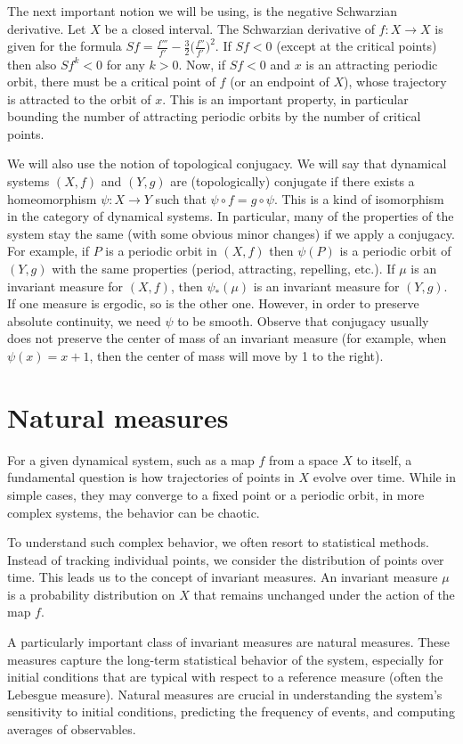 \documentclass[format=acmsmall, authorversion, screen=true]{acmart}
\begin{document}
The next important notion we will be using, is the negative Schwarzian derivative. Let $X$ be a closed interval. The Schwarzian derivative of $f\colon X\to X$ is given for the formula $Sf=\frac{f'''}{f'}-\frac32\big(\frac{f''}{f'}\big)^2$. If $Sf<0$ (except at the critical points) then also $Sf^k<0$ for any $k>0$. Now, if $Sf<0$ and $x$ is an attracting periodic orbit, there must be a critical point of $f$ (or an endpoint of $X$), whose trajectory is attracted to the orbit of $x$. This is an important property, in particular bounding the number of attracting periodic orbits by the number of critical points.

We will also use the notion of topological conjugacy. We will say that dynamical systems $(X,f)$ and $(Y,g)$ are (topologically) conjugate if there exists a homeomorphism $\psi:X\to Y$ such that $\psi\circ f=g\circ\psi$. This is a kind of isomorphism in the category of dynamical systems. In particular, many of the properties of the system stay the same (with some obvious minor changes) if we apply a conjugacy. For example, if $P$ is a periodic orbit in $(X,f)$ then $\psi(P)$ is a periodic orbit of $(Y,g)$ with the same properties (period, attracting, repelling, etc.). If $\mu$ is an invariant measure for $(X,f)$, then $\psi_*(\mu)$ is an invariant measure for $(Y,g)$. If one measure is ergodic, so is the other one. However, in order to preserve absolute continuity, we need $\psi$ to be smooth. Observe that conjugacy usually does not preserve the center of mass of an invariant measure (for example, when $\psi(x)=x+1$, then the center of mass will move by 1 to the right).

\section{Natural measures}
\label{sec:natural}
For a given dynamical system, such as a map $f$ from a space $X$ to itself, a fundamental question is how trajectories of points in $X$ evolve over time. While in simple cases, they may converge to a fixed point or a periodic orbit, in more complex systems, the behavior can be chaotic.

To understand such complex behavior, we often resort to statistical methods. Instead of tracking individual points, we consider the distribution of points over time. This leads us to the concept of invariant measures. An invariant measure $\mu$ is a probability distribution on $X$ that remains unchanged under the action of the map $f$.

A particularly important class of invariant measures are natural measures. These measures capture the long-term statistical behavior of the system, especially for initial conditions that are typical with respect to a reference measure (often the Lebesgue measure). Natural measures are crucial in understanding the system's sensitivity to initial conditions, predicting the frequency of events, and computing averages of observables.
\end{document}
